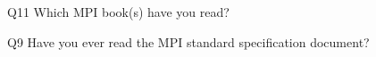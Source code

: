 \begin{description}%
\item{Q11} Which MPI book(s) have you read?%
\item{Q9} Have you ever read the MPI standard specification document?%
\end{description}%
